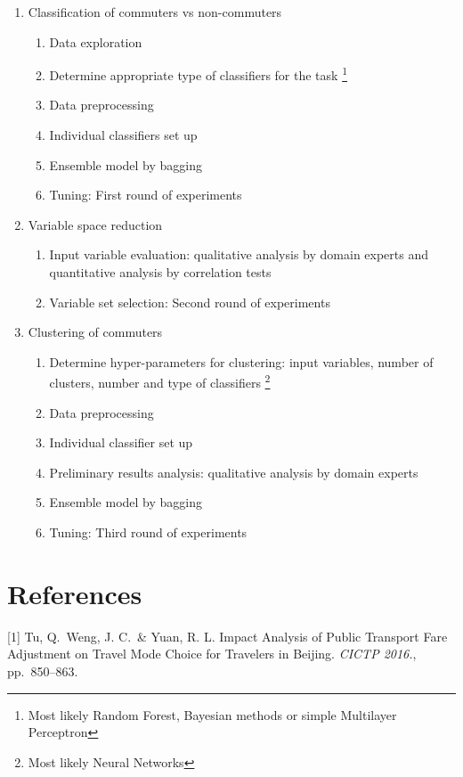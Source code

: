 \documentclass{article}
\begin{document}
\begin{enumerate}
\item[Stage 1:] Classification of commuters vs non-commuters
	\begin{enumerate}
	\item Data exploration
	\item Determine appropriate type of classifiers for the task \footnote{Most likely Random Forest, Bayesian methods or simple Multilayer Perceptron}
	\item Data preprocessing
	\item Individual classifiers set up 
	\item Ensemble model by bagging
	\item Tuning: First round of experiments
	\end{enumerate}

\item[Stage 2:] Variable space reduction 
	\begin{enumerate}
	\item Input variable evaluation: qualitative analysis by domain experts and quantitative analysis by correlation tests
	\item Variable set selection: Second round of experiments
	\end{enumerate}

\item[Stage 3:] Clustering of commuters
	\begin{enumerate}
	\item Determine hyper-parameters for clustering: input variables, number of clusters, number and type of classifiers \footnote{Most likely Neural Networks}
	\item Data preprocessing
	\item Individual classifier set up
	\item Preliminary results analysis: qualitative analysis by domain experts
	\item Ensemble model by bagging
	\item Tuning: Third round of experiments
	\end{enumerate}

\end{enumerate}



\section*{References}

\small

[1] Tu, Q.\ Weng, J. C.\ \& Yuan, R. L. Impact Analysis of Public Transport Fare Adjustment on Travel Mode Choice for Travelers in Beijing. {\it CICTP 2016.}, pp.\ 850--863.
\end{document}
